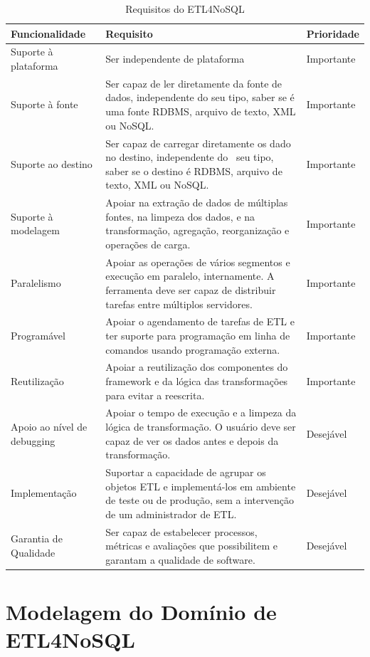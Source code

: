 \begin{table}[h]
	\centering
	\caption{Requisitos do ETL4NoSQL}
	\label{requisitos}
	\begin{tabular}{|p{3cm}| p{10cm}| p{2cm} |}
		\hline
		Funcionalidade & Requisito & Prioridade\\
		\hline
		Suporte à plataforma &  Ser independente de plataforma & Importante\\
		\hline
		Suporte à fonte &  Ser capaz de ler diretamente da fonte de dados, independente do seu tipo, saber se é uma fonte RDBMS, arquivo de texto, XML ou NoSQL. & Importante\\
		\hline
		Suporte ao destino & Ser capaz de carregar diretamente os dado no destino, independente do  seu tipo, saber se o destino é RDBMS, arquivo de texto, XML ou NoSQL. & Importante\\
		\hline
		Suporte à modelagem & Apoiar na extração de dados de múltiplas fontes, na limpeza dos dados, e na transformação, agregação, reorganização e operações de carga. & Importante\\
		\hline
		Paralelismo &Apoiar as operações de vários segmentos e execução em paralelo, internamente. A ferramenta deve ser capaz de distribuir tarefas entre múltiplos servidores. & Importante\\
		\hline
		Programável &Apoiar o agendamento de tarefas de ETL e ter suporte para programação em linha de comandos usando programação externa. & Importante\\
		\hline
		Reutilização & Apoiar a reutilização dos componentes do framework e da lógica das transformações para evitar a reescrita. & Importante\\
		\hline
		Apoio ao nível de debugging & Apoiar o tempo de execução e a limpeza da lógica de transformação. O usuário deve ser capaz de ver os dados antes e depois da transformação. & Desejável\\
		\hline
		Implementação & Suportar a capacidade de agrupar os objetos ETL e implementá-los em ambiente de teste ou de produção, sem a intervenção de um administrador de ETL. & Desejável\\
		\hline
		Garantia de Qualidade & Ser capaz de estabelecer processos, métricas e avaliações que possibilitem e garantam a qualidade de software. & Desejável\\
		\hline
		
		
	\end{tabular}
\end{table}


\section{Modelagem do Domínio de ETL4NoSQL}

